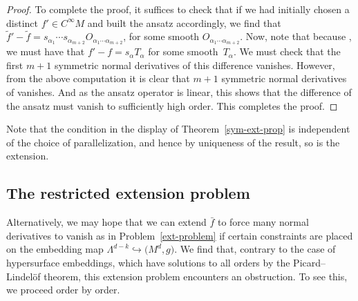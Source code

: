 \documentclass[10pt,a4paper]{article}
\numberwithin{equation}{section}
\renewcommand{\=}{\stackrel \Lambda =}
\begin{document}
\begin{proof}
To complete the proof, it suffices to check that if we had initially chosen a distinct ${f' \in C^\infty M}$ and built the ansatz accordingly, we find that $\tilde{f}'-\tilde{f} = s_{\alpha_1} \cdots s_{\alpha_{m+2}} O_{\alpha_1 \cdots \alpha_{m+2}}$, for some smooth $O_{\alpha_1 \cdots \alpha_{m+2}}$. Now, note that because \smash{$f'|_{\Lambda} \= \bar{f}$}, we must have that $f' - f = s_{\alpha} T_{\alpha}$ for some smooth~$T_{\alpha}$. We must check that the first $m+1$ symmetric normal derivatives of this difference vanishes. However, from the above computation it is clear that $m+1$ symmetric normal deri\-vatives of  vanishes. And as the ansatz operator is linear, this shows that the difference of the ansatz must vanish to sufficiently high order. This completes the proof.
\end{proof}

\begin{Remark}
Note that the condition in the display of Theorem~\ref{sym-ext-prop} is independent of the choice of parallelization, and hence by uniqueness of the result, so is the extension.
\end{Remark}





\subsection{The restricted extension problem}

Alternatively, we may hope that we can extend $\bar{f}$ to force many normal derivatives to vanish as in Problem~\ref{ext-problem} if certain constraints are placed on the embedding map $\Lambda^{d-k} \hookrightarrow \bigl(M^d,g\bigr)$.
We find that, contrary to the case of hypersurface embeddings, which have solutions to all orders by the Picard--Lindel{\"o}f theorem, this extension problem encounters an obstruction. To see this, we proceed order by order.
\end{document}
